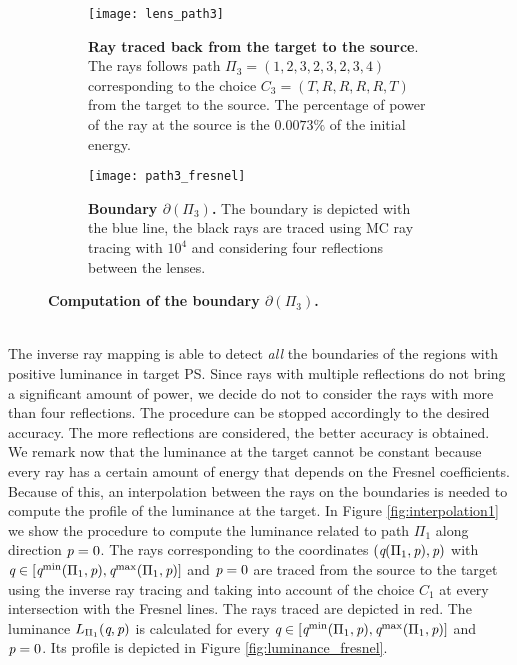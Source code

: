 \begin{figure}[t]
\centering
\begin{subfigure}[t]{.45\textwidth}
  \texttt{[image: lens\_path3]}
 \caption{\textbf{Ray traced back from the target to the source}. The rays follows path $\Pi_3 = (1,2,3,2,3,2,3,4)$ corresponding to the choice $C_3=(T,R,R,R,R,T)$ from the target to the source. The percentage of power of the ray at the source is the $0.0073\%$ of the initial energy.}
  \label{fig:ray_path3}
\end{subfigure}%
\hfill
\begin{subfigure}[t]{.45\textwidth}
  \texttt{[image: path3\_fresnel]}
  \caption{\textbf{Boundary $\partial$$(\Pi_3)$.} The boundary is depicted with the blue line, the black rays are traced using MC ray tracing with $10^4$ and considering four reflections between the lenses.} %
  \label{fig:boundary_path3}
\end{subfigure} %
\caption{\textbf{Computation of the boundary $\partial$$(\Pi_3)$.}}
\end{figure}
\\ \indent 
The inverse ray mapping is able to detect \textit{all} the boundaries of the regions with positive luminance in target PS. Since rays with multiple reflections do not bring a significant amount of power, we decide do not to consider the rays with more than four reflections. The procedure can be stopped accordingly to the desired accuracy. The more reflections are considered, the better accuracy is obtained. \\ \indent
We remark now that the luminance at the target cannot be constant because every ray has a certain amount of energy that depends on the Fresnel coefficients. Because of this, an interpolation between the rays on the boundaries is needed to compute the profile of the luminance at the target. In Figure \ref{fig:interpolation1} we show the procedure to compute the luminance related to path $\Pi_1$ along direction $\textit{p}=0$. The rays corresponding to the coordinates $(\textit{q}(\Pi_1, \textit{p}), \textit{p})$ with $\textit{q}\in[\textit{q}^{\textrm{min}}(\Pi_1,\textit{p}), \textit{q}^{\textrm{max}}(\Pi_1,\textit{p})]$ and $\textit{p}=0$ are traced from the source to the target using the inverse ray tracing and taking into account of the choice $C_1$ at every intersection with the Fresnel lines. The rays traced are depicted in red. The luminance $L_{\Pi_1}(\textit{q}, \textit{p})$ is calculated for every $\textit{q}\in[\textit{q}^{\textrm{min}}(\Pi_1,\textit{p}), \textit{q}^{\textrm{max}}(\Pi_1,\textit{p})]$ and $\textit{p}=0$. Its profile is depicted in Figure \ref{fig:luminance_fresnel}.
